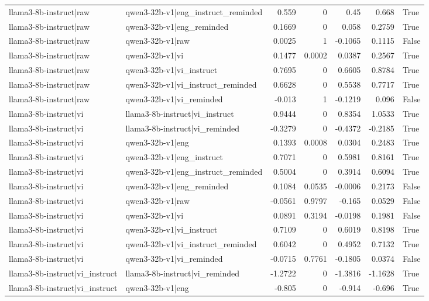 \begin{table}
\begin{tabular}{l l r r r r l}
llama3-8b-instruct|raw & qwen3-32b-v1|eng_instruct_reminded & 0.559 & 0 & 0.45 & 0.668 & True \\
llama3-8b-instruct|raw & qwen3-32b-v1|eng_reminded & 0.1669 & 0 & 0.058 & 0.2759 & True \\
llama3-8b-instruct|raw & qwen3-32b-v1|raw & 0.0025 & 1 & -0.1065 & 0.1115 & False \\
llama3-8b-instruct|raw & qwen3-32b-v1|vi & 0.1477 & 0.0002 & 0.0387 & 0.2567 & True \\
llama3-8b-instruct|raw & qwen3-32b-v1|vi_instruct & 0.7695 & 0 & 0.6605 & 0.8784 & True \\
llama3-8b-instruct|raw & qwen3-32b-v1|vi_instruct_reminded & 0.6628 & 0 & 0.5538 & 0.7717 & True \\
llama3-8b-instruct|raw & qwen3-32b-v1|vi_reminded & -0.013 & 1 & -0.1219 & 0.096 & False \\
llama3-8b-instruct|vi & llama3-8b-instruct|vi_instruct & 0.9444 & 0 & 0.8354 & 1.0533 & True \\
llama3-8b-instruct|vi & llama3-8b-instruct|vi_reminded & -0.3279 & 0 & -0.4372 & -0.2185 & True \\
llama3-8b-instruct|vi & qwen3-32b-v1|eng & 0.1393 & 0.0008 & 0.0304 & 0.2483 & True \\
llama3-8b-instruct|vi & qwen3-32b-v1|eng_instruct & 0.7071 & 0 & 0.5981 & 0.8161 & True \\
llama3-8b-instruct|vi & qwen3-32b-v1|eng_instruct_reminded & 0.5004 & 0 & 0.3914 & 0.6094 & True \\
llama3-8b-instruct|vi & qwen3-32b-v1|eng_reminded & 0.1084 & 0.0535 & -0.0006 & 0.2173 & False \\
llama3-8b-instruct|vi & qwen3-32b-v1|raw & -0.0561 & 0.9797 & -0.165 & 0.0529 & False \\
llama3-8b-instruct|vi & qwen3-32b-v1|vi & 0.0891 & 0.3194 & -0.0198 & 0.1981 & False \\
llama3-8b-instruct|vi & qwen3-32b-v1|vi_instruct & 0.7109 & 0 & 0.6019 & 0.8198 & True \\
llama3-8b-instruct|vi & qwen3-32b-v1|vi_instruct_reminded & 0.6042 & 0 & 0.4952 & 0.7132 & True \\
llama3-8b-instruct|vi & qwen3-32b-v1|vi_reminded & -0.0715 & 0.7761 & -0.1805 & 0.0374 & False \\
llama3-8b-instruct|vi_instruct & llama3-8b-instruct|vi_reminded & -1.2722 & 0 & -1.3816 & -1.1628 & True \\
llama3-8b-instruct|vi_instruct & qwen3-32b-v1|eng & -0.805 & 0 & -0.914 & -0.696 & True \\

\end{tabular}
\end{table}
